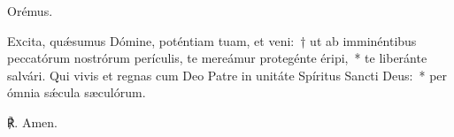 Orémus.

\lettrine{E}{x}cita, quǽsumus Dómine, poténtiam \noindent tuam, et veni:~† ut ab imminéntibus peccatórum nostrórum perículis, te mereámur protegénte éripi,~* te liberánte salvári. Qui vivis et regnas cum Deo Patre in unitáte Spíritus Sancti Deus:~* per ómnia sǽcula sæculórum.

℟. Amen.